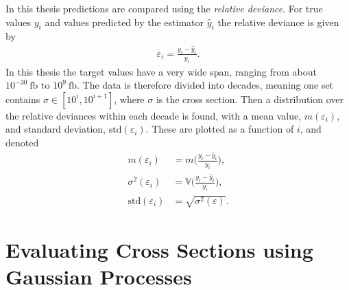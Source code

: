 \documentclass[twoside,english]{uiofysmaster}
\makeatletter
\newenvironment{chapquote}[2][2em]
  {\setlength{\@tempdima}{#1}%
   \def\chapquote@author{#2}%
   \parshape 1 \@tempdima \dimexpr\textwidth-2\@tempdima\relax%
   \itshape}
  {\par\normalfont\hfill--\ \chapquote@author\hspace*{\@tempdima}\par\bigskip}
\makeatother
\begin{document}
{{In this thesis predictions are compared using the \textit{relative deviance}. For true values $y_i$ and values predicted by the estimator $\hat{y}_i$ the relative deviance is given by
\begin{align}\label{Eq:: gaussian process : Relative deviance}
\varepsilon_i = \frac{y_i - \hat{y}_i}{y_i}.
\end{align} 
In this thesis the target values have a very wide span, ranging from about $10^{-30}~\mathrm{fb}$ to $10^9~\mathrm{fb}$. The data is therefore divided into decades, meaning one set contains $\sigma \in [10^i, 10^{i+1}]$, where $\sigma$ is the cross section. Then a distribution over the relative deviances within each decade is found, with a mean value, $m(\varepsilon_i)$, and standard deviation, $\mathrm{std}(\varepsilon_i)$. These are plotted as a function of $i$, and denoted
\begin{align}
m(\varepsilon_i) &= m \Big(\frac{y_i - \hat{y}_i}{y_i}\Big),\label{Eq:: gaussian process : rel deviance mean} \\
\sigma^2 (\varepsilon_i) &= \mathbb{V} \Big(\frac{y_i - \hat{y}_i}{y_i}\Big),\label{Eq:: gaussian process : rel deviance variance}\\
\mathrm{std}(\varepsilon_i) &= \sqrt{\sigma^2(\varepsilon)}.
\end{align} 







\chapter{Evaluating Cross Sections using Gaussian Processes}\label{Chapter:Evaluating Cross Sections using Gaussian Processes}



}}
\end{document}
